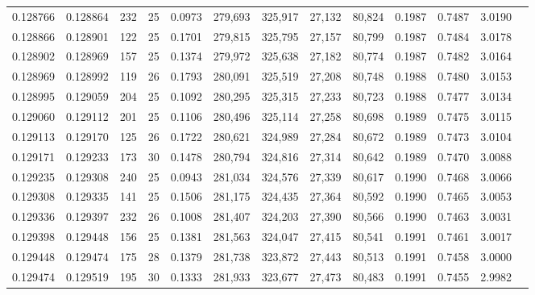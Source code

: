 \begin{tabular}{rrrrrrrrrrrrr}
0.128766 & 0.128864 & 232 &  25 &                                     0.0973 & 279,693 & 325,917 &  27,132 &  80,824 & 0.1987 & 0.7487 & 3.0190 \\
0.128866 & 0.128901 & 122 &  25 &                                     0.1701 & 279,815 & 325,795 &  27,157 &  80,799 & 0.1987 & 0.7484 & 3.0178 \\
0.128902 & 0.128969 & 157 &  25 &                                     0.1374 & 279,972 & 325,638 &  27,182 &  80,774 & 0.1987 & 0.7482 & 3.0164 \\
0.128969 & 0.128992 & 119 &  26 &                                     0.1793 & 280,091 & 325,519 &  27,208 &  80,748 & 0.1988 & 0.7480 & 3.0153 \\
0.128995 & 0.129059 & 204 &  25 &                                     0.1092 & 280,295 & 325,315 &  27,233 &  80,723 & 0.1988 & 0.7477 & 3.0134 \\
0.129060 & 0.129112 & 201 &  25 &                                     0.1106 & 280,496 & 325,114 &  27,258 &  80,698 & 0.1989 & 0.7475 & 3.0115 \\
0.129113 & 0.129170 & 125 &  26 &                                     0.1722 & 280,621 & 324,989 &  27,284 &  80,672 & 0.1989 & 0.7473 & 3.0104 \\
0.129171 & 0.129233 & 173 &  30 &                                     0.1478 & 280,794 & 324,816 &  27,314 &  80,642 & 0.1989 & 0.7470 & 3.0088 \\
0.129235 & 0.129308 & 240 &  25 &                                     0.0943 & 281,034 & 324,576 &  27,339 &  80,617 & 0.1990 & 0.7468 & 3.0066 \\
0.129308 & 0.129335 & 141 &  25 &                                     0.1506 & 281,175 & 324,435 &  27,364 &  80,592 & 0.1990 & 0.7465 & 3.0053 \\
0.129336 & 0.129397 & 232 &  26 &                                     0.1008 & 281,407 & 324,203 &  27,390 &  80,566 & 0.1990 & 0.7463 & 3.0031 \\
0.129398 & 0.129448 & 156 &  25 &                                     0.1381 & 281,563 & 324,047 &  27,415 &  80,541 & 0.1991 & 0.7461 & 3.0017 \\
0.129448 & 0.129474 & 175 &  28 &                                     0.1379 & 281,738 & 323,872 &  27,443 &  80,513 & 0.1991 & 0.7458 & 3.0000 \\
0.129474 & 0.129519 & 195 &  30 &                                     0.1333 & 281,933 & 323,677 &  27,473 &  80,483 & 0.1991 & 0.7455 & 2.9982 \\

\end{tabular}
